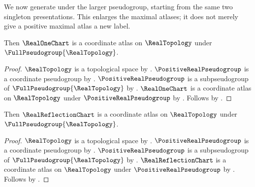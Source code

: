 We now generate under the larger pseudogroup, starting from the same two
singleton presentations. This enlarges the maximal atlases; it does not merely
give a positive maximal atlas a new label.

\begin{classification}\label{real_identity_full_atlas}
    Then $\RealOneChart$ is a coordinate atlas on $\RealTopology$ under
        $\FullPseudogroup{\RealTopology}$.
\end{classification}
\begin{proof}
    $\RealTopology$ is a topological space by .
    $\PositiveRealPseudogroup$ is a coordinate pseudogroup by .
    $\PositiveRealPseudogroup$ is a subpseudogroup of $\FullPseudogroup{\RealTopology}$ by
        .
    $\RealOneChart$ is a coordinate atlas on $\RealTopology$ under $\PositiveRealPseudogroup$
        by .
    Follows by .
\end{proof}

\begin{classification}\label{real_reflection_full_atlas}
    Then $\RealReflectionChart$ is a coordinate atlas on $\RealTopology$ under
        $\FullPseudogroup{\RealTopology}$.
\end{classification}
\begin{proof}
    $\RealTopology$ is a topological space by .
    $\PositiveRealPseudogroup$ is a coordinate pseudogroup by .
    $\PositiveRealPseudogroup$ is a subpseudogroup of $\FullPseudogroup{\RealTopology}$ by
        .
    $\RealReflectionChart$ is a coordinate atlas on $\RealTopology$ under $\PositiveRealPseudogroup$
        by .
    Follows by .
\end{proof}

